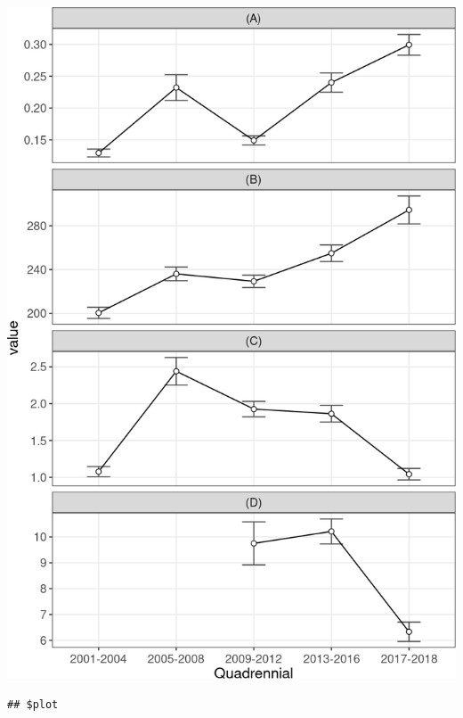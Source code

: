 \documentclass[10pt,landscape,a3paper]{article}
\begin{document}
\begin{center}\includegraphics{img/modelling/aa-eda-ts-10} \end{center}

\begin{verbatim}
## $plot
\end{verbatim}
\end{document}
